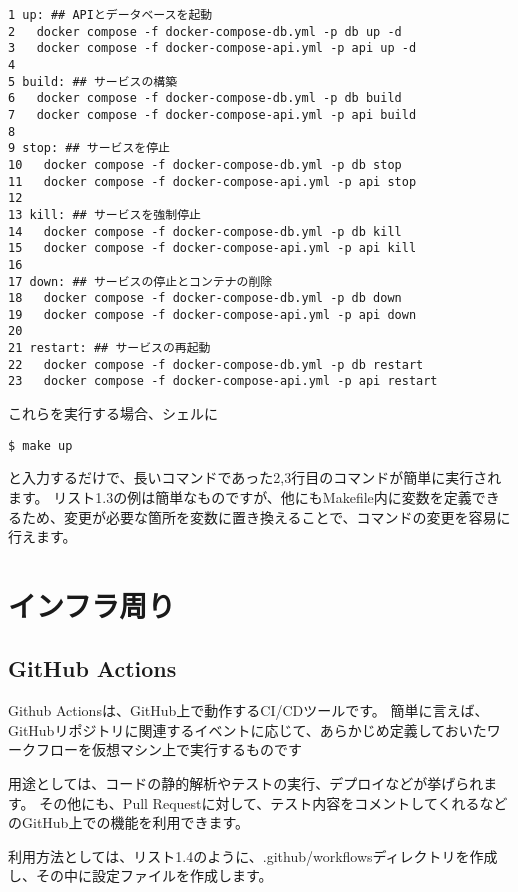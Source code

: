 \begin{tcolorbox}[title=リスト1.3 Makefile]
  \begin{verbatim}
1 up: ## APIとデータベースを起動
2   docker compose -f docker-compose-db.yml -p db up -d
3   docker compose -f docker-compose-api.yml -p api up -d
4 
5 build: ## サービスの構築
6   docker compose -f docker-compose-db.yml -p db build
7   docker compose -f docker-compose-api.yml -p api build
8 
9 stop: ## サービスを停止
10   docker compose -f docker-compose-db.yml -p db stop
11   docker compose -f docker-compose-api.yml -p api stop
12 
13 kill: ## サービスを強制停止
14   docker compose -f docker-compose-db.yml -p db kill
15   docker compose -f docker-compose-api.yml -p api kill
16 
17 down: ## サービスの停止とコンテナの削除
18   docker compose -f docker-compose-db.yml -p db down
19   docker compose -f docker-compose-api.yml -p api down
20 
21 restart: ## サービスの再起動
22   docker compose -f docker-compose-db.yml -p db restart
23   docker compose -f docker-compose-api.yml -p api restart
 \end{verbatim}
\end{tcolorbox}

これらを実行する場合、シェルに
\begin{shaded}
  \begin{verbatim}
$ make up
\end{verbatim}
\end{shaded}
と入力するだけで、長いコマンドであった2,3行目のコマンドが簡単に実行されます。
リスト1.3の例は簡単なものですが、他にもMakefile内に変数を定義できるため、変更が必要な箇所を変数に置き換えることで、コマンドの変更を容易に行えます。

\section{インフラ周り}

\subsection{GitHub Actions}
Github Actionsは、GitHub上で動作するCI/CDツールです。
簡単に言えば、GitHubリポジトリに関連するイベントに応じて、あらかじめ定義しておいたワークフローを仮想マシン上で実行するものです

用途としては、コードの静的解析やテストの実行、デプロイなどが挙げられます。
その他にも、Pull Requestに対して、テスト内容をコメントしてくれるなどのGitHub上での機能を利用できます。

利用方法としては、リスト1.4のように、.github/workflowsディレクトリを作成し、その中に設定ファイルを作成します。


